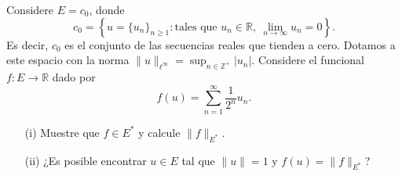 
Considere $E = c_0$, donde
\[
c_0 = \left\{ u = \{u_n\}_{n \geq 1} :\text{tales que } u_n \in \mathbb{R}, \ \lim_{n \to \infty} u_n = 0 \right\}.
\]
Es decir, $c_0$ es el conjunto de las secuencias reales que tienden a cero. Dotamos a este espacio con la norma
$
\|u\|_{\ell^\infty} = \sup_{n \in \mathbb{Z}^+} |u_n|.
$
Considere el funcional $f : E \to \mathbb{R}$ dado por
\[
f(u) = \sum_{n=1}^{\infty} \frac{1}{2^n} u_n.
\]

\begin{enumerate}
    \item[(i)] Muestre que $f \in E^*$ y calcule $\|f\|_{E^*}$.
    \item[(ii)] ¿Es posible encontrar $u \in E$ tal que $\|u\| = 1$ y $f(u) = \|f\|_{E^*}$?
\end{enumerate}




